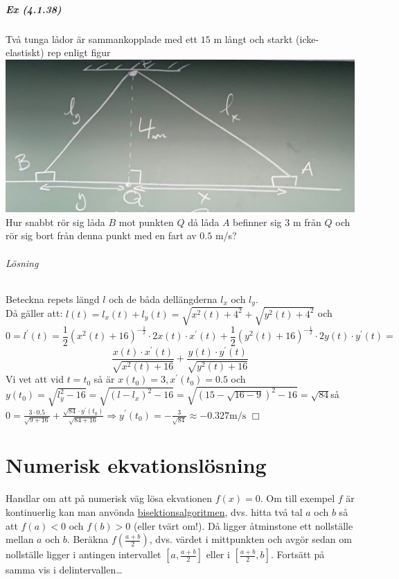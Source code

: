 \paragraph{Ex (4.1.38)} Två tunga lådor är sammankopplade med ett $15$ m långt och starkt (icke-elastiskt) rep enligt figur\\
\includegraphics[scale=0.1]{lessons/lesson10/imgs/img02.jpg}\\
Hur snabbt rör sig låda $B$ mot punkten $Q$ då låda $A$ befinner sig $3$ m
från $Q$ och rör sig bort från denna punkt med en fart av $0.5$ m/s?
\subparagraph{Lösning}
Beteckna repets längd $l$ och de båda dellängderna $l_x$ och $l_y$.\\
Då gäller att:
$l(t)=l_x(t)+l_y(t)=\sqrt{x^2(t)+4^2}+\sqrt{y^2(t)+4^2}$ och
\begin{equation*}
    0=l^\prime(t)=\frac{1}{2}(x^2(t)+16)^{-\frac{1}{2}}\cdot 2x(t)\cdot x^\prime(t)+\frac{1}{2}(y^2(t)+16)^{-\frac{1}{2}}\cdot 2y(t)\cdot y^\prime(t)=
\end{equation*}
\begin{equation*}
    \frac{x(t)\cdot x^\prime(t)}{\sqrt{x^2(t)+16}}+\frac{y(t)\cdot y^\prime(t)}{\sqrt{y^2(t)+16}}
\end{equation*}
Vi vet att vid $t=t_0$ så är $x(t_0)=3,x^\prime(t_0)=0.5$ och \\
$y(t_0)=\sqrt{l_y^2-16}=\sqrt{(l-l_x)^2-16}=\sqrt{(15-\sqrt{16-9})^2-16}=\sqrt{84}$så \\
$0=\frac{3\cdot 0.5}{\sqrt{9+16}}+\frac{\sqrt{84}\cdot y^\prime(t_0)}{\sqrt{84+16}}\Rightarrow y^\prime(t_0)=-\frac{3}{\sqrt{84}}\approx -0.327\text{m/s }\Box$

\chapter{Numerisk ekvationslösning}
Handlar om att på numerisk väg lösa ekvationen $f(x)=0$.
Om till exempel $f$ är kontinuerlig kan man anvönda \underline{bisektionsalgoritmen}, dvs. hitta två tal $a$ och $b$ så att $f(a)<0$ och $f(b)>0$ (eller tvärt om!).
Då ligger åtminstone ett nollställe mellan $a$ och $b$.
Beräkna $f(\frac{a+b}{2})$, dvs. värdet i mittpunkten och avgör sedan om nollställe ligger i antingen intervallet $[a,\frac{a+b}{2}]$ eller i $[\frac{a+b}{2}, b]$.
Fortsätt på samma vis i delintervallen\dots

